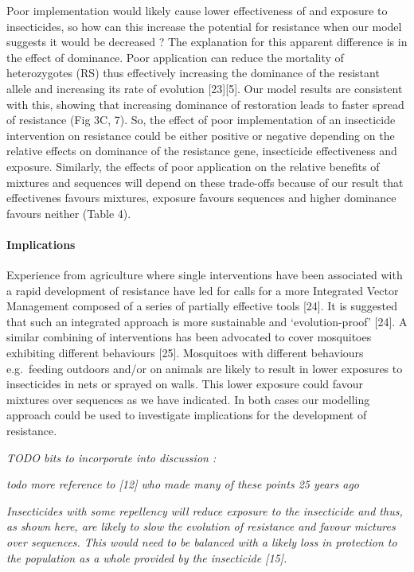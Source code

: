 \documentclass[11pt,]{article}
\let\oldparagraph\paragraph
\renewcommand{\paragraph}[1]{\oldparagraph{#1}\mbox{}}
\begin{document}
Poor implementation would likely cause lower effectiveness of and
exposure to insecticides, so how can this increase the potential for
resistance when our model suggests it would be decreased ? The
explanation for this apparent difference is in the effect of dominance.
Poor application can reduce the mortality of heterozygotes (RS) thus
effectively increasing the dominance of the resistant allele and
increasing its rate of evolution {[}23{]}{[}5{]}. Our model results are
consistent with this, showing that increasing dominance of restoration
leads to faster spread of resistance (Fig 3C, 7). So, the effect of poor
implementation of an insecticide intervention on resistance could be
either positive or negative depending on the relative effects on
dominance of the resistance gene, insecticide effectiveness and
exposure. Similarly, the effects of poor application on the relative
benefits of mixtures and sequences will depend on these trade-offs
because of our result that effectivenes favours mixtures, exposure
favours sequences and higher dominance favours neither (Table 4).

\paragraph{Implications}\label{implications}

Experience from agriculture where single interventions have been
associated with a rapid development of resistance have led for calls for
a more Integrated Vector Management composed of a series of partially
effective tools {[}24{]}. It is suggested that such an integrated
approach is more sustainable and `evolution-proof' {[}24{]}. A similar
combining of interventions has been advocated to cover mosquitoes
exhibiting different behaviours {[}25{]}. Mosquitoes with different
behaviours e.g.~feeding outdoors and/or on animals are likely to result
in lower exposures to insecticides in nets or sprayed on walls. This
lower exposure could favour mixtures over sequences as we have
indicated. In both cases our modelling approach could be used to
investigate implications for the development of resistance.

\emph{TODO bits to incorporate into discussion :}

\emph{todo more reference to {[}12{]} who made many of these points 25
years ago}

\emph{Insecticides with some repellency will reduce exposure to the
insecticide and thus, as shown here, are likely to slow the evolution of
resistance and favour mictures over sequences. This would need to be
balanced with a likely loss in protection to the population as a whole
provided by the insecticide {[}15{]}.}
\end{document}

